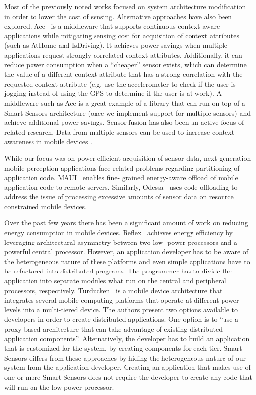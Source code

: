Most of the previously noted works focused on system architecture 
modification in order to lower the cost of sensing. Alternative 
approaches have also been explored. Ace~\cite{ace} is a middleware that 
supports continuous context-aware applications while mitigating sensing 
cost for acquisition of context attributes (such as AtHome and IsDriving). 
It achieves power savings when multiple applications request strongly 
correlated context attributes. Additionally, it can reduce power 
consumption when a ``cheaper'' sensor exists, which can determine the 
value of a different context attribute that has a strong correlation with 
the requested context attribute (e.g. use the accelerometer to check if 
the user is jogging instead of using the GPS to determine if the user is 
at work). A middleware such as Ace is a great example of a library that 
can run on top of a Smart Sensors architecture (once we implement support 
for multiple sensors) and achieve additional power savings. Sensor fusion 
has also been an active focus of related research. Data from multiple 
sensors can be used to increase context-awareness in mobile devices 
\cite{gellersen2002multi,biegel2004framework}.

While our focus was on power-efficient acquisition of sensor data, next 
generation mobile perception applications face related problems regarding 
partitioning of application code. MAUI~\cite{maui} enables fine-
grained energy-aware offload of mobile application code to remote 
servers. Similarly, Odessa~\cite{ra2011odessa} uses code-offloading to 
address the issue of processing excessive amounts of sensor data on 
resource constrained mobile devices.

\iffalse
Over the past few years there has been a significant 
amount of work on reducing energy consumption in mobile 
devices. Reflex~\cite{reflex} achieves energy efficiency 
by leveraging architectural asymmetry between two low-
power processors and a powerful central processor. 
However, an application developer has to be aware of the 
heterogeneous nature of these platforms and even simple 
applications have to be refactored into distributed 
programs. The programmer has to divide the application 
into separate modules what run on the central and 
peripheral processors, respectively. Turducken~\cite{
turducken} is a mobile device architecture that 
integrates several mobile computing platforms that 
operate at different power levels into a multi-tiered 
device. The authors present two options available to 
developers in order to create distributed applications. 
One option is to ``use a proxy-based architecture that 
can take advantage of existing distributed application 
components''. Alternatively, the developer has to build 
an application that is customized for the system, by 
creating components for each tier. Smart Sensors differs 
from these approaches by hiding the heterogeneous nature 
of our system from the application developer. Creating an 
application that makes use of one or more Smart Sensors 
does not require the developer to create any code that 
will run on the low-power processor.

